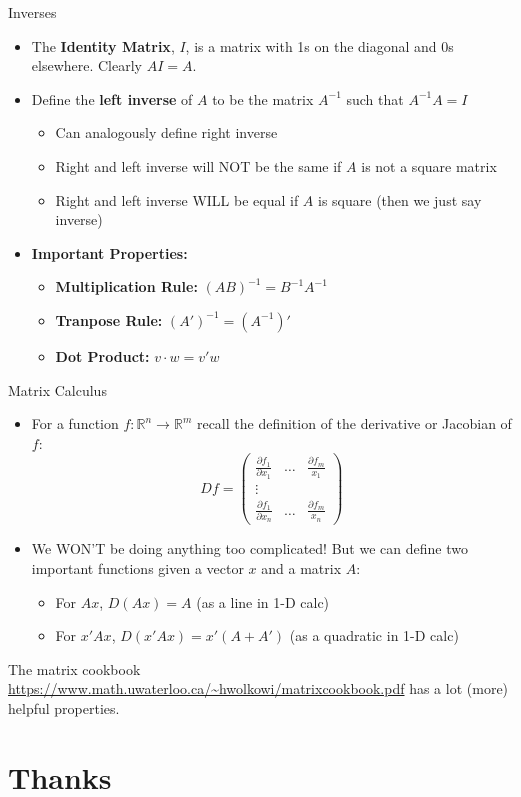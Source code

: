 \documentclass[aspectratio=169,11pt]{beamer}
\begin{document}
\begin{frame}{Inverses}
\begin{itemize}
	\item The {\bf Identity Matrix}, $I$, is a matrix with 1s on the diagonal and 0s elsewhere. Clearly $AI = A$.	
	\item Define the {\bf left inverse} of $A$ to be the matrix $A^{-1}$ such that $A^{-1}A=I$
	\begin{itemize}
		\item Can analogously define right inverse
		\item Right and left inverse will NOT be the same if $A$ is not a square matrix
		\item Right and left inverse WILL be equal if $A$ is square (then we just say inverse)
	\end{itemize}
	\item {\bf Important Properties:}
		\begin{itemize}
			\item {\bf Multiplication Rule:} $(AB)^{-1} = B^{-1}A^{-1}$
			\item {\bf Tranpose Rule:} $(A')^{-1} = (A^{-1})'$
			\item {\bf Dot Product:} $v\cdot w = v'w$
		\end{itemize}
\end{itemize}

\end{frame}

\begin{frame}{Matrix Calculus}
	\begin{itemize}
		\item For a function $f:\mathbb{R}^n\to\mathbb{R}^m$ recall the definition of the derivative or Jacobian of $f$:
			\[
				Df = \left(\begin{array}{ccc}
					\frac{\partial f_1}{\partial x_1} & \dots & \frac{\partial f_m}{x_1}\\
					\vdots & & \\
					\frac{\partial f_1}{\partial x_n} & \dots & \frac{\partial f_m}{x_n}
					 \end{array}\right)
			\]
		\item We WON'T be doing anything too complicated! But we can define two important functions given a vector $x$ and a matrix $A$:
		\begin{itemize}
			\item For $Ax$, $D(Ax) = A$ (as a line in 1-D calc)
			\item For $x'Ax$, $D(x'Ax) = x'(A+A')$ (as a quadratic in 1-D calc)
		\end{itemize}
	\end{itemize}
	The matrix cookbook \url{https://www.math.uwaterloo.ca/~hwolkowi/matrixcookbook.pdf} has a lot (more) helpful properties.
\end{frame}



\section{Thanks}
\end{document}
